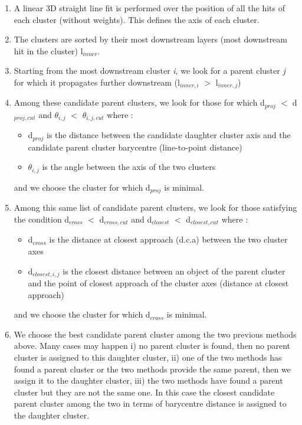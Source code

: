 \documentclass[12pt]{article}
\begin{document}
\begin{enumerate}
  \item A linear 3D straight line fit is performed over the position of all the hits of each cluster (without weights). This defines the axis of each cluster.
  \item The clusters are sorted by their most downstream layers (most downstream hit in the cluster) l$_{inner}$.
  \item Starting from the most downstream cluster \textit{i}, we look for a parent cluster \textit{j} for which it propagates further downstream (l$_{inner,i}$ $>$ l$_{inner,j}$)
  \item Among these candidate parent clusters, we look for those for which d$_{proj}$ $<$ d$_{proj,cut}$ and $\theta_{i,j}$ $<$ $\theta_{i,j,cut}$  where :
  \begin{itemize}
    \item d$_{proj}$ is the distance between the candidate daughter cluster axis and the candidate parent cluster barycentre (line-to-point distance)
    \item $\theta_{i,j}$ is the angle between the axis of the two clusters
  \end{itemize}
  and we choose the cluster for which d$_{proj}$ is minimal.  
  \item Among this same list of candidate parent clusters, we look for those satisfying the condition d$_{cross}$ $<$ d$_{cross,cut}$ and d$_{closest}$ $<$ d$_{closest,cut}$ where :
  \begin{itemize}
    \item d$_{cross}$ is the distance at closest approach (d.c.a) between the two cluster axes
    \item d$_{closest,i,j}$ is the closest distance between an object of the parent cluster and the point of closest approach of the cluster axes (distance at closest approach)
  \end{itemize}
  and we choose the cluster for which d$_{cross}$ is minimal.
  \item We choose the best candidate parent cluster among the two previous methods above. Many cases may happen i) no parent cluster is found, then no parent cluster is assigned to this daughter cluster, ii) one of the two methods has found a parent cluster or the two methods provide the same parent, then we assign it to the daughter cluster, iii) the two methods have found a parent cluster but they are not the same one. In this case the closest candidate parent cluster among the two in terms of barycentre distance is assigned to the daughter cluster.

\end{enumerate}
\end{document}
